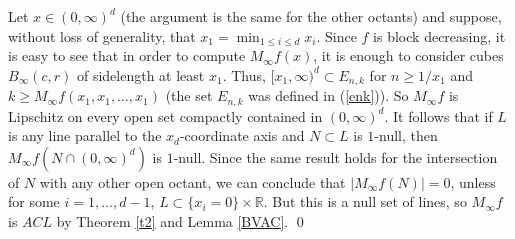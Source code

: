 \documentclass[12pt]{amsart}
\numberwithin{equation}{section}
\theoremstyle{plain}
\theoremstyle{definition}
\theoremstyle{remark}
\begin{document}
Let $x\in(0,\infty)^d$ (the argument is the same for the other octants) and suppose, without loss of generality, that  $x_1=\min_{1\le i\le d}x_i$.
 Since $f$ is block decreasing, it is easy to see that
 in order to compute
 $M_\infty f(x)$, it is enough to consider cubes $B_\infty (c, r)$ of sidelength at least
 $x_1$.
 Thus, $[x_1,\infty)^d \subset E_{n,k}$
 for $n \ge 1/ x_1$ and $k \ge M_\infty f(x_1, x_1, \dots, x_1)$
 (the set  $E_{n,k}$ was defined in (\ref{enk})). So $M_\infty f$
 is Lipschitz on every open set compactly contained in $(0,\infty)^d$.
It follows that if $L$ is any line parallel to the $x_d$-coordinate
axis and $N\subset L$ is $1$-null, then $M_\infty f (N\cap (0,\infty)^d)$
is $1$-null. Since the same result holds for the intersection of $N$
with any other open octant, we can conclude that $|M_\infty f (N)| = 0$, unless for some
$i = 1,\dots, d - 1$, $L\subset \{x_i=0\}\times\mathbb{R}$.
But this is a null set of lines, so  $M_\infty f$ is $ACL$
by Theorem \ref{t2} and Lemma \ref{BVAC}.
\qed
\end{document}
